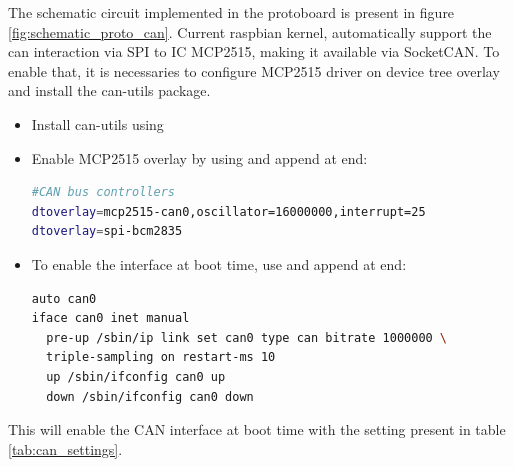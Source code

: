 The schematic circuit implemented in the protoboard is present in figure \ref{fig:schematic_proto_can}.
Current raspbian kernel, automatically support the can interaction via \gls{SPI} to \gls{IC} MCP2515, making it available via SocketCAN. To enable that, it is necessaries to configure MCP2515 driver on device tree overlay and install the can-utils package.
\begin{itemize}
	\tightlist
	\item Install can-utils using 
	\item Enable MCP2515 overlay by using  and append at end:
	\begin{lstlisting}[label={lst:boot_settings},frame=none,language=bash,backgroundcolor=\color{gray!15},numbers=none,basicstyle=\ttfamily]
#CAN bus controllers
dtoverlay=mcp2515-can0,oscillator=16000000,interrupt=25
dtoverlay=spi-bcm2835
\end{lstlisting}
	\item To enable the interface at boot time, use  and append at end:
	\begin{minipage}{\linewidth} %
\begin{lstlisting}[frame=none,language=bash,backgroundcolor=\color{gray!15},numbers=none,		basicstyle=\ttfamily]
auto can0
iface can0 inet manual
  pre-up /sbin/ip link set can0 type can bitrate 1000000 \
  triple-sampling on restart-ms 10
  up /sbin/ifconfig can0 up
  down /sbin/ifconfig can0 down
\end{lstlisting}
	\end{minipage}
\end{itemize}
This will enable the \gls{CAN} interface at boot time with the setting present in table \ref{tab:can_settings}.



